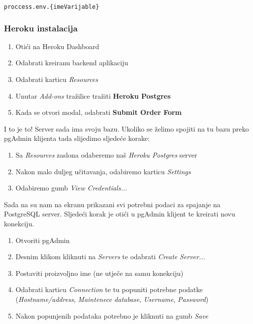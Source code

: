 		        \begin{center}
	                \texttt{proccess.env.\{imeVarijable\}}
		        \end{center}
		
		
		    \subsubsection*{Heroku instalacija}
		    
		         \begin{enumerate}
		            \item Otići na Heroku Dashboard
		            \item Odabrati kreiranu backend aplikaciju
		            \item Odabrati karticu \textit{Resources}
		            \item Unutar \textit{Add-ons} tražilice tražiti \textbf{Heroku Postgres}
		            \item Kada se otvori modal, odabrati \textbf{Submit Order Form}
		        \end{enumerate}
		        
		        I to je to! Server sada ima svoju bazu. Ukoliko se želimo spojiti na tu bazu preko pgAdmin klijenta tada slijedimo sljedeće korake:
		        
		         \begin{enumerate}
		            \item Sa \textit{Resources} zaslona odaberemo naš \textit{Heroku Postgres} server
		            \item Nakon malo duljeg učitavanja, odabiremo karticu \textit{Settings}
		            \item Odabiremo gumb \textit{View Credentials...}
		        \end{enumerate}
		        
		        Sada na su nam na ekranu prikazani svi potrebni podaci za spajanje na PostgreSQL server. Sljedeći korak je otići u pgAdmin klijent te kreirati novu konekciju.
		        
		         \begin{enumerate}
		            \item Otvoriti pgAdmin
		            \item Desnim klikom kliknuti na \textit{Servers} te odabrati \textit{Create} \textit{Server...}
		            \item Postaviti proizvoljno ime (ne utječe na samu konekciju)
		            \item Odabrati karticu \textit{Connection} te tu popuniti potrebne podatke (\textit{Hostname/address}, \textit{Maintenece database}, \textit{Username}, \textit{Password})
		            \item Nakon popunjenih podataka potrebno je kliknuti na gumb \textit{Save}
		        \end{enumerate}
		        
